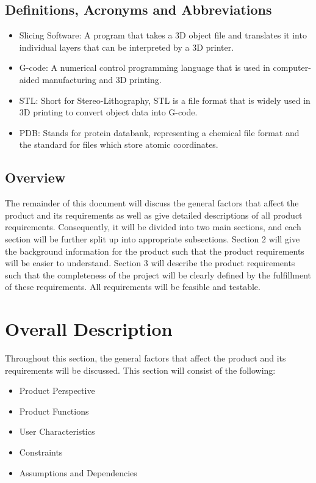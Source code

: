 \documentclass[letterpaper, onecolumn, draftclsnofoot, 10pt, compsoc]{IEEEtran}
\begin{document}
\subsection{Definitions, Acronyms and Abbreviations} %
  \begin{itemize}
  	\item Slicing Software: A program that takes a 3D object file and translates it into individual layers that can be interpreted by a 3D printer.
    \item G-code: A numerical control programming language that is used in computer-aided manufacturing and 3D printing.
    \item STL: Short for Stereo-Lithography, STL is a file format that is widely used in 3D printing to convert object data into G-code.
    \item PDB: Stands for protein databank, representing a chemical file format and the standard for files which store atomic coordinates.
  \end{itemize}

\subsection{Overview} %
The remainder of this document will discuss the general factors that affect the product and its requirements as well as give detailed descriptions of all product requirements. 
Consequently, it will be divided into two main sections, and each section will be further split up into appropriate subsections.
Section 2 will give the background information for the product such that the product requirements will be easier to understand.
Section 3 will describe the product requirements such that the completeness of the project will be clearly defined by the fulfillment of these requirements.
All requirements will be feasible and testable.

\section{Overall Description}
Throughout this section, the general factors that affect the product and its requirements will be discussed. 
This section will consist of the following:
\begin{itemize}
	\item Product Perspective
    \item Product Functions
    \item User Characteristics
    \item Constraints
    \item Assumptions and Dependencies
\end{itemize}
\end{document}

